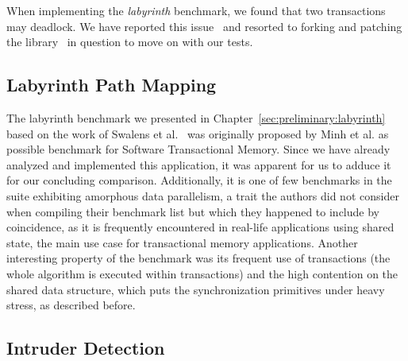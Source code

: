 When implementing the \emph{labyrinth} benchmark, we found that two transactions may deadlock.
We have reported this issue~\cite{wittwer2020stmissue} and resorted to forking and patching the library~\cite{wittwer2020stm} in question to move on with our tests.


\subsection{Labyrinth Path Mapping}
\label{sec:experiments:labyrinth}

The labyrinth benchmark we presented in Chapter~\ref{sec:preliminary:labyrinth} based on the work of Swalens et al.~\cite{swalens2016transactional} was originally proposed by Minh et al. as possible benchmark for Software Transactional Memory.
Since we have already analyzed and implemented this application, it was apparent for us to adduce it for our concluding comparison.
Additionally, it is one of few benchmarks in the suite exhibiting amorphous data parallelism, a trait the authors did not consider when compiling their benchmark list but which they happened to include by coincidence, as it is frequently encountered in real-life applications using shared state, the main use case for transactional memory applications.
Another interesting property of the benchmark was its frequent use of transactions (the whole algorithm is executed within transactions) and the high contention on the shared data structure, which puts the synchronization primitives under heavy stress, as described before.



\subsection{Intruder Detection}
\label{sec:experiments:intruder}

